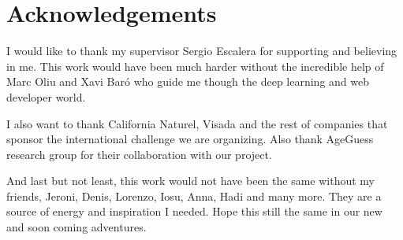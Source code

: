 \documentclass[11pt, oneside]{book}
\begin{document}
\setcounter{page}{3}


\chapter*{} %
\thispagestyle{empty}

\thispagestyle{empty}
\chapter*{Acknowledgements}
\thispagestyle{empty}

I would like to thank my supervisor Sergio Escalera for supporting and believing in me. This work would have been much harder without the incredible help of Marc Oliu and Xavi Baró who guide me though the deep learning and web developer world.

I also want to thank California Naturel, Visada and the rest of companies that sponsor the international challenge we are organizing. Also thank AgeGuess research group for their collaboration with our project.

And last but not least, this work would not have been the same without my friends, Jeroni, Denis, Lorenzo, Iosu, Anna, Hadi and many more. They are a source of energy and inspiration I needed. Hope this still the same in our new and soon coming adventures.

\setcounter{page}{0}
\clearpage

\newpage
{} %

\newpage
\tableofcontents

\newpage
\listoftables

\newpage
\listoffigures

\newpage
{} %









\renewcommand{\bibname}{\refname} %
\addcontentsline{toc}{chapter}{\bibname}



\glsaddall
\printglossaries


\end{document}
